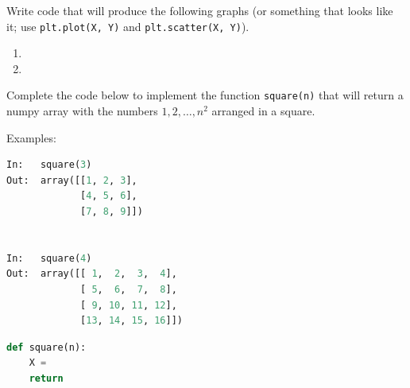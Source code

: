 \documentclass[addpoints,12pt]{exam}
\newcommand{\code}[1]{{\texttt{#1}}}
\begin{document}
\begin{questions}
\newpage
\question[20] Write code that will produce the following graphs (or something that looks like it; use \code{plt.plot(X, Y)} and \code{plt.scatter(X, Y)}).
\begin{enumerate}
\item
{}
\vfill
\item 
{}
\vfill
\end{enumerate}





\newpage
\question[20] Complete the code below to implement the function \code{square(n)} that will return a numpy array with the numbers $1,2,\dots,n^2$ arranged in a square.

Examples:
\begin{lstlisting}[language=python]
In:   square(3)
Out:  array([[1, 2, 3],
             [4, 5, 6],
             [7, 8, 9]])


In:   square(4)
Out:  array([[ 1,  2,  3,  4],
             [ 5,  6,  7,  8],
             [ 9, 10, 11, 12],
             [13, 14, 15, 16]])
\end{lstlisting}

\begin{lstlisting}[language=python]
def square(n):
    X = 
    return 
\end{lstlisting}


\end{questions}
\end{document}
